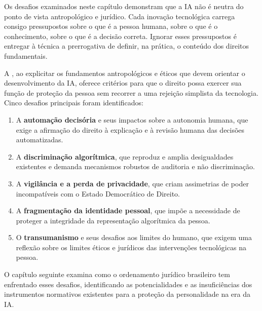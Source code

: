 Os desafios examinados neste capítulo demonstram que a IA não é neutra do ponto de vista antropológico e jurídico. Cada inovação tecnológica carrega consigo pressupostos sobre o que é a pessoa humana, sobre o que é o conhecimento, sobre o que é a decisão correta. Ignorar esses pressupostos é entregar à técnica a prerrogativa de definir, na prática, o conteúdo dos direitos fundamentais.

A \MH{}, ao explicitar os fundamentos antropológicos e éticos que devem orientar o desenvolvimento da IA, oferece critérios para que o direito possa exercer sua função de proteção da pessoa sem recorrer a uma rejeição simplista da tecnologia. Cinco desafios principais foram identificados:

\begin{enumerate}
    \item A \textbf{automação decisória} e seus impactos sobre a autonomia humana, que exige a afirmação do direito à explicação e à revisão humana das decisões automatizadas.
    \item A \textbf{discriminação algorítmica}, que reproduz e amplia desigualdades existentes e demanda mecanismos robustos de auditoria e não discriminação.
    \item A \textbf{vigilância e a perda de privacidade}, que criam assimetrias de poder incompatíveis com o Estado Democrático de Direito.
    \item A \textbf{fragmentação da identidade pessoal}, que impõe a necessidade de proteger a integridade da representação algorítmica da pessoa.
    \item O \textbf{transumanismo} e seus desafios aos limites do humano, que exigem uma reflexão sobre os limites éticos e jurídicos das intervenções tecnológicas na pessoa.
\end{enumerate}

O capítulo seguinte examina como o ordenamento jurídico brasileiro tem enfrentado esses desafios, identificando as potencialidades e as insuficiências dos instrumentos normativos existentes para a proteção da personalidade na era da IA.
